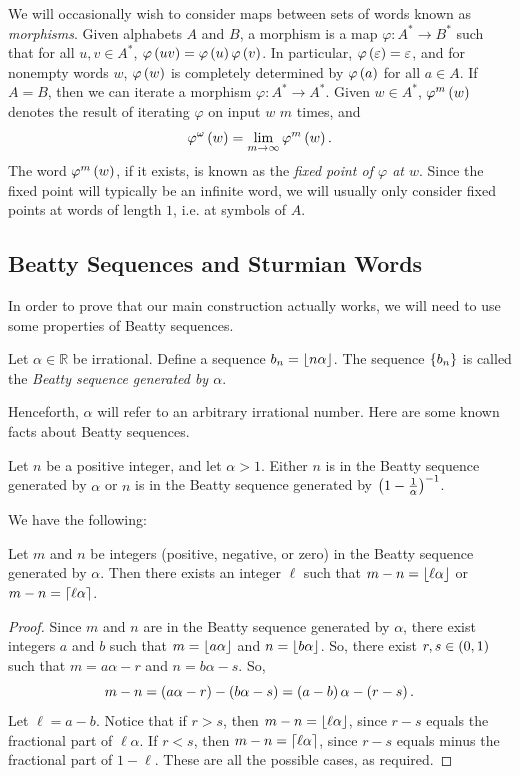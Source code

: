 \documentclass[english,12pt]{article}
\begin{document}
We will occasionally wish to consider maps between sets of words known as \emph{morphisms}.  Given alphabets $A$ and $B$, a morphism is a map $\varphi:A^*\to B^*$ such that for all $u,v\in A^*$, $\varphi\left(uv\right)=\varphi\left(u\right)\varphi\left(v\right)$.  In particular, $\varphi\left(\varepsilon\right)=\varepsilon$, and for nonempty words $w$, $\varphi\left(w\right)$ is completely determined by $\varphi\left(a\right)$ for all $a\in A$.  If $A=B$, then we can iterate a morphism $\varphi:A^*\to A^*$.  Given $w\in A^*$, $\varphi^m\left(w\right)$ denotes the result of iterating $\varphi$ on input $w$ $m$ times, and
\[
\varphi^\omega\left(w\right)=\lim_{m\rightarrow\infty}{\varphi}^m\left(w\right).
\]
The word $\varphi^m\left(w\right)$, if it exists, is known as the \emph{fixed point of $\varphi$ at $w$}.  Since the fixed point will typically be an infinite word, we will usually only consider fixed points at words of length $1$, i.e. at symbols of $A$.
\subsection{Beatty Sequences and Sturmian Words}\label{ss:beatty}
In order to prove that our main construction actually works, we will need to use some properties of Beatty sequences.
\begin{defin}\cite{rs}
Let $\alpha\in\mathbb{R}$ be irrational.  Define a sequence $b_n=\left\lfloor n\alpha\right\rfloor$.  The sequence $\left\{b_n\right\}$ is called the \emph{Beatty sequence generated by $\alpha$}.
\end{defin}
Henceforth, $\alpha$ will refer to an arbitrary irrational number.  Here are some known facts about Beatty sequences.
\begin{prop}\label{prop:beattycomp}\cite{rs}
Let $n$ be a positive integer, and let $\alpha>1$.  Either $n$ is in the Beatty sequence generated by $\alpha$ or $n$ is in the Beatty sequence generated by $\left(1-\frac{1}{\alpha}\right)^{-1}$. 
\end{prop}
We have the following:
\begin{prop}\label{prop:beattyforbdiff}
Let $m$ and $n$ be integers (positive, negative, or zero) in the Beatty sequence generated by $\alpha$.  Then there exists an integer $\ell$ such that $m-n=\left\lfloor\ell\alpha\right\rfloor$ or $m-n=\left\lceil\ell\alpha\right\rceil$.
\end{prop}
\begin{proof}
Since $m$ and $n$ are in the Beatty sequence generated by $\alpha$, there exist integers $a$ and $b$ such that $m=\left\lfloor a\alpha\right\rfloor$ and $n=\left\lfloor b\alpha\right\rfloor$.  So, there exist $r,s\in\left(0,1\right)$ such that $m=a\alpha-r$ and $n=b\alpha-s$.  So,
\[
m-n=\left(a\alpha-r\right)-\left(b\alpha-s\right)=\left(a-b\right)\alpha-\left(r-s\right).
\]
Let $\ell=a-b$.  Notice that if $r>s$, then $m-n=\left\lfloor\ell\alpha\right\rfloor$, since $r-s$ equals the fractional part of $\ell\alpha$.  If $r<s$, then $m-n=\left\lceil\ell\alpha\right\rceil$, since $r-s$ equals minus the fractional part of $1-\ell$.  These are all the possible cases, as required.
\end{proof}
\end{document}
